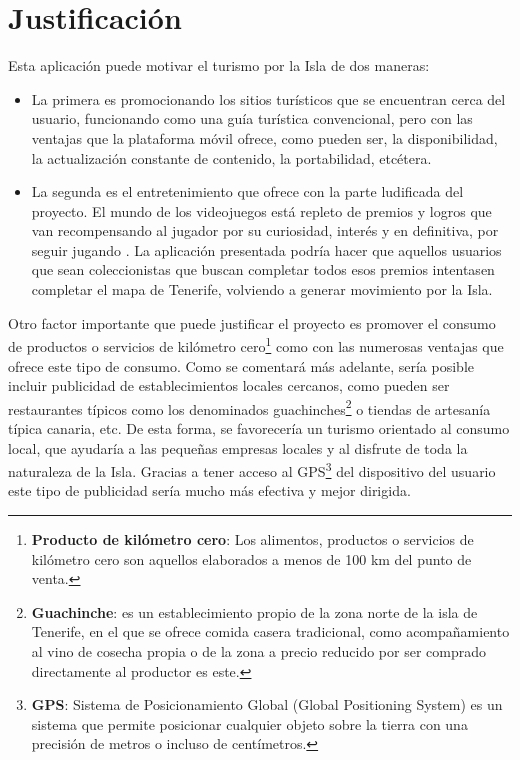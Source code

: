

\section{Justificación}

Esta aplicación puede motivar el turismo por la Isla de dos maneras:
\begin{itemize}
\item La primera es promocionando los sitios turísticos que se encuentran cerca del usuario, funcionando como una guía turística convencional, pero con las ventajas que la plataforma móvil ofrece, como pueden ser, la disponibilidad, la actualización constante de contenido, la portabilidad, etcétera.

\item La segunda es el entretenimiento que ofrece con la parte ludificada del proyecto. El mundo de los videojuegos está repleto de premios y logros que van recompensando al jugador por su curiosidad, interés y en definitiva, por seguir jugando \cite{porquenosgustanvideojuegos}. La aplicación presentada podría hacer que aquellos usuarios que sean coleccionistas que buscan completar todos esos premios intentasen completar el mapa de Tenerife, volviendo a generar movimiento por la Isla.

\end{itemize}

Otro factor importante que puede justificar el proyecto es promover el consumo de productos o servicios de kilómetro cero\footnote{\textbf{Producto de kilómetro cero}: Los alimentos, productos o servicios de kilómetro cero son aquellos elaborados a menos de 100 km del punto de venta.} como con las numerosas ventajas que ofrece este tipo de consumo. \cite{kilometro0} Como se comentará más adelante, sería posible incluir publicidad de establecimientos locales cercanos, como pueden ser restaurantes típicos como los denominados guachinches\footnote{\textbf{Guachinche}: es un establecimiento propio de la zona norte de la isla de Tenerife, en el que se ofrece comida casera tradicional, como acompañamiento al vino de cosecha propia o de la zona a precio reducido por ser comprado directamente al productor es este.} o tiendas de artesanía típica canaria, etc. De esta forma, se favorecería un turismo orientado al consumo local, que ayudaría a las pequeñas empresas locales y al disfrute de toda la naturaleza de la Isla. Gracias a tener acceso al GPS\footnote{\textbf{GPS}: Sistema de Posicionamiento Global (Global Positioning System) es un sistema que permite posicionar cualquier objeto sobre la tierra con una precisión de metros o incluso de centímetros.} del dispositivo del usuario este tipo de publicidad sería mucho más efectiva y mejor dirigida.

